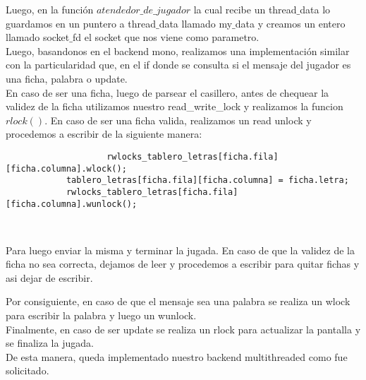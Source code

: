 Luego, en la función $atendedor\_de\_jugador$ la cual recibe un thread$\_$data lo guardamos en un puntero a thread$\_$data llamado
my$\_$data y creamos un entero llamado socket$\_$fd el socket que nos viene como parametro.\\

Luego, basandonos en el backend mono, realizamos una implementación similar con la particularidad que, en el if donde se
consulta si el mensaje del jugador es una ficha, palabra o update.\\
En caso de ser una ficha, luego de parsear el casillero, antes de chequear la validez de la ficha utilizamos nuestro read\_write\_lock y realizamos
la funcion $rlock()$. En caso de ser una ficha valida, realizamos un read unlock y procedemos a escribir de la siguiente manera:\\
\begin{verbatim}
                    rwlocks_tablero_letras[ficha.fila][ficha.columna].wlock();
		    tablero_letras[ficha.fila][ficha.columna] = ficha.letra;
		    rwlocks_tablero_letras[ficha.fila][ficha.columna].wunlock();
                     
                     
\end{verbatim}
Para luego enviar la misma y terminar la jugada. En caso de que la validez de la ficha no sea correcta, dejamos de leer
y procedemos a escribir para quitar fichas y asi dejar de escribir.

Por consiguiente, en caso de que el mensaje sea una palabra se realiza un wlock para escribir la palabra y luego un wunlock.\\
Finalmente, en caso de ser update se realiza un rlock para actualizar la pantalla y se finaliza la jugada.\\

De esta manera, queda implementado nuestro backend multithreaded como fue solicitado.






